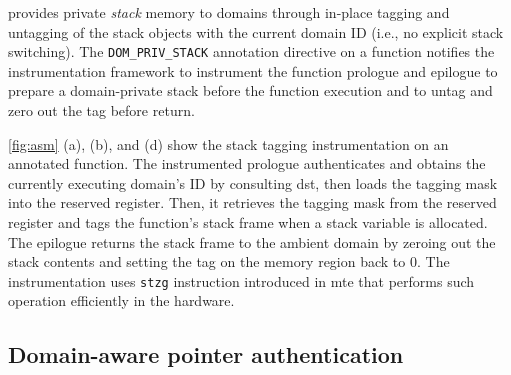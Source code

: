 \thename provides private \emph{stack} memory to domains through in-place tagging and untagging of the stack objects with the current domain ID (i.e., no explicit stack switching).
The \texttt{DOM\_PRIV\_STACK} annotation directive on a function notifies the instrumentation framework to instrument the function prologue and epilogue to prepare a domain-private stack before the function execution and to untag and zero out the tag before return.

\autoref{fig:asm} (a), (b), and (d) show the stack tagging instrumentation on an annotated function.
The instrumented prologue authenticates and obtains the currently executing domain's ID by consulting \gls{dst}, then loads the tagging mask into the reserved register.
Then, it retrieves the tagging mask from the reserved register and tags the function's stack frame when a stack variable is allocated.
The epilogue returns the stack frame to the ambient domain by zeroing out the stack contents and setting the tag on the memory region back to 0.
The instrumentation uses \texttt{stzg} instruction introduced in \gls{mte} that performs such operation efficiently in the hardware.




\subsection{Domain-aware pointer authentication}
\label{sec:design:ptrauth}

